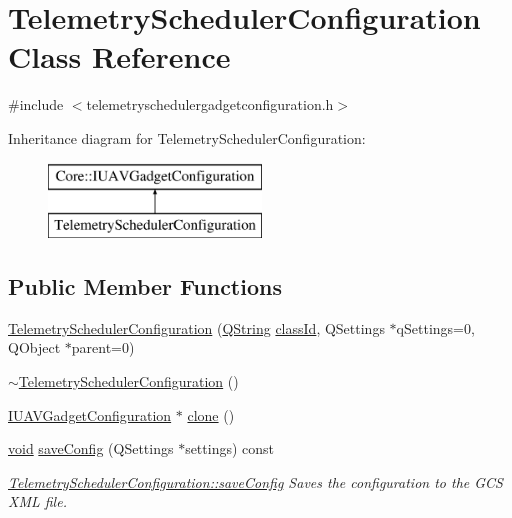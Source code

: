 \hypertarget{class_telemetry_scheduler_configuration}{\section{\-Telemetry\-Scheduler\-Configuration \-Class \-Reference}
\label{class_telemetry_scheduler_configuration}
}


{\ttfamily \#include $<$telemetryschedulergadgetconfiguration.\-h$>$}

\-Inheritance diagram for \-Telemetry\-Scheduler\-Configuration\-:\begin{figure}[H]
\begin{center}
\leavevmode
\includegraphics[height=2.000000cm]{class_telemetry_scheduler_configuration}
\end{center}
\end{figure}
\subsection*{\-Public \-Member \-Functions}
\begin{DoxyCompactItemize}
\item 
\hyperlink{group___telemetry_scheduler_ga3b163cd7c5c2a5da472979be2e78dadd}{\-Telemetry\-Scheduler\-Configuration} (\hyperlink{group___u_a_v_objects_plugin_gab9d252f49c333c94a72f97ce3105a32d}{\-Q\-String} \hyperlink{group___core_plugin_gac953657221ba7fda967ada0408332641}{class\-Id}, \-Q\-Settings $\ast$q\-Settings=0, \-Q\-Object $\ast$parent=0)
\item 
\hyperlink{group___telemetry_scheduler_ga23cad1ffa0ae20024c6fa42fcc76c635}{$\sim$\-Telemetry\-Scheduler\-Configuration} ()
\item 
\hyperlink{group___core_plugin_gacdfdf0b1e39b5002472b76b6564ce51f}{\-I\-U\-A\-V\-Gadget\-Configuration} $\ast$ \hyperlink{group___telemetry_scheduler_ga1cb06a537bf6e46691c183c5993e66ee}{clone} ()
\item 
\hyperlink{group___u_a_v_objects_plugin_ga444cf2ff3f0ecbe028adce838d373f5c}{void} \hyperlink{group___telemetry_scheduler_ga9ccdf37f141feff3fd8b942d0bf2127f}{save\-Config} (\-Q\-Settings $\ast$settings) const 
\begin{DoxyCompactList}\small\item\em \hyperlink{group___telemetry_scheduler_ga9ccdf37f141feff3fd8b942d0bf2127f}{\-Telemetry\-Scheduler\-Configuration\-::save\-Config} \-Saves the configuration to the \-G\-C\-S \-X\-M\-L file. \end{DoxyCompactList}\end{DoxyCompactItemize}


